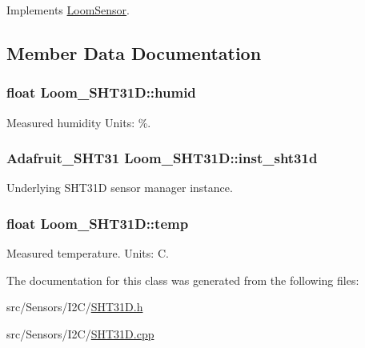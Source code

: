 Implements \hyperlink{class_loom_sensor_aba2aa35441c2eb1cf27b95a1fc08b288}{Loom\+Sensor}.



\subsection{Member Data Documentation}
\subsubsection[{\texorpdfstring{humid}{humid}}]{\setlength{\rightskip}{0pt plus 5cm}float Loom\+\_\+\+S\+H\+T31\+D\+::humid\hspace{0.3cm}{\ttfamily [protected]}}\hypertarget{class_loom___s_h_t31_d_aa52f9a6c11c80630b8616e5e7c54e803}{}\label{class_loom___s_h_t31_d_aa52f9a6c11c80630b8616e5e7c54e803}


Measured humidity Units\+: \%. 

\subsubsection[{\texorpdfstring{inst\+\_\+sht31d}{inst_sht31d}}]{\setlength{\rightskip}{0pt plus 5cm}Adafruit\+\_\+\+S\+H\+T31 Loom\+\_\+\+S\+H\+T31\+D\+::inst\+\_\+sht31d\hspace{0.3cm}{\ttfamily [protected]}}\hypertarget{class_loom___s_h_t31_d_a83749e1a9e51c760894f9ba0ec097bbf}{}\label{class_loom___s_h_t31_d_a83749e1a9e51c760894f9ba0ec097bbf}


Underlying S\+H\+T31D sensor manager instance. 

\subsubsection[{\texorpdfstring{temp}{temp}}]{\setlength{\rightskip}{0pt plus 5cm}float Loom\+\_\+\+S\+H\+T31\+D\+::temp\hspace{0.3cm}{\ttfamily [protected]}}\hypertarget{class_loom___s_h_t31_d_a3a3d827860de7979d783b9f472379028}{}\label{class_loom___s_h_t31_d_a3a3d827860de7979d783b9f472379028}


Measured temperature. Units\+: C. 



The documentation for this class was generated from the following files\+:\begin{DoxyCompactItemize}
\item 
src/\+Sensors/\+I2\+C/\hyperlink{_s_h_t31_d_8h}{S\+H\+T31\+D.\+h}\item 
src/\+Sensors/\+I2\+C/\hyperlink{_s_h_t31_d_8cpp}{S\+H\+T31\+D.\+cpp}\end{DoxyCompactItemize}
